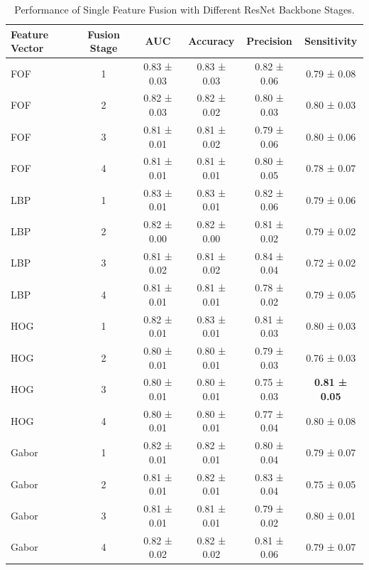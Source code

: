 \begin{table}[htbp]
    \centering
    \caption{Performance of Single Feature Fusion with Different ResNet Backbone Stages.}
    \label{tab:resnet_fusion_layers_grouped}
    \begin{tabular}{lccccc}
        \toprule
        \textbf{Feature Vector} & \textbf{Fusion Stage} & \textbf{AUC} & \textbf{Accuracy} & \textbf{Precision} & \textbf{Sensitivity} \\
        \midrule
        FOF             & 1 & 0.83 ± 0.03 & 0.83 ± 0.03 & 0.82 ± 0.06 & 0.79 ± 0.08 \\
        FOF             & 2 & 0.82 ± 0.03 & 0.82 ± 0.02 & 0.80 ± 0.03 & 0.80 ± 0.03 \\
        FOF             & 3 & 0.81 ± 0.01 & 0.81 ± 0.02 & 0.79 ± 0.06 & 0.80 ± 0.06 \\
        FOF             & 4 & 0.81 ± 0.01 & 0.81 ± 0.01 & 0.80 ± 0.05 & 0.78 ± 0.07 \\
        \hline \addlinespace
        LBP             & 1 & 0.83 ± 0.01 & 0.83 ± 0.01 & 0.82 ± 0.06 & 0.79 ± 0.06 \\
        LBP             & 2 & 0.82 ± 0.00 & 0.82 ± 0.00 & 0.81 ± 0.02 & 0.79 ± 0.02 \\
        LBP             & 3 & 0.81 ± 0.02 & 0.81 ± 0.02 & 0.84 ± 0.04 & 0.72 ± 0.02 \\
        LBP             & 4 & 0.81 ± 0.01 & 0.81 ± 0.01 & 0.78 ± 0.02 & 0.79 ± 0.05 \\
        \hline \addlinespace
        HOG             & 1 & 0.82 ± 0.01 & 0.83 ± 0.01 & 0.81 ± 0.03 & 0.80 ± 0.03 \\
        HOG             & 2 & 0.80 ± 0.01 & 0.80 ± 0.01 & 0.79 ± 0.03 & 0.76 ± 0.03 \\
        HOG             & 3 & 0.80 ± 0.01 & 0.80 ± 0.01 & 0.75 ± 0.03 & \textbf{0.81 ± 0.05} \\
        HOG             & 4 & 0.80 ± 0.01 & 0.80 ± 0.01 & 0.77 ± 0.04 & 0.80 ± 0.08 \\
        \hline \addlinespace
        Gabor           & 1 & 0.82 ± 0.01 & 0.82 ± 0.01 & 0.80 ± 0.04 & 0.79 ± 0.07 \\
        Gabor           & 2 & 0.81 ± 0.01 & 0.82 ± 0.01 & 0.83 ± 0.04 & 0.75 ± 0.05 \\
        Gabor           & 3 & 0.81 ± 0.01 & 0.81 ± 0.01	& 0.79 ± 0.02 & 0.80 ± 0.01 \\
        Gabor           & 4 & 0.82 ± 0.02 & 0.82 ± 0.02 & 0.81 ± 0.06 & 0.79 ± 0.07 \\

\end{tabular}
\end{table}
